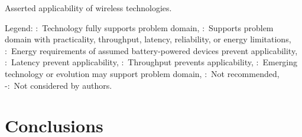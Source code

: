 \begin{table}[htbp]
	\setlength{\tabcolsep}{1.4pt}
  	\centering
  	\caption{Asserted applicability of wireless technologies.}
  	\label{tbl:techmap}%
  	\begin{adjustbox}{width=\textwidth}
	
	\end{adjustbox}
	\vspace{3pt}
	\raggedright
	
	Legend: 
	\CIRCLE:~{Technology fully supports problem domain,}
	\LEFTcircle:~{Supports problem domain with practicality, throughput, latency, reliability, or energy limitations,}
	\lightning:~{Energy requirements of assumed battery-powered devices prevent applicability,}
	\clock:~{Latency prevent applicability,}
	\DOWNarrow:~{Throughput prevents applicability,}
	\hexstar:~{Emerging technology or evolution may support problem domain,}
	\fullmoon:~{Not recommended,}
	-:~{Not considered by authors.}
\end{table}%

    
	\section{Conclusions}\label{sec:conclusion}
    
